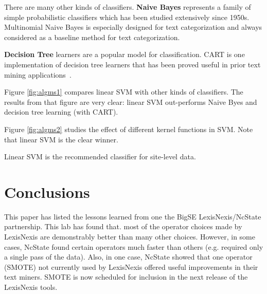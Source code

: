 \documentclass{sig-alternate-05-2015}
\theoremstyle{break}
\begin{document}
There are many other kinds of classifiers.
\textbf{Naive Bayes} represents a family of simple probabilistic classifiers which has been studied extensively since 1950s. Multinomial Naive Bayes is especially designed for text categorization \cite{mccallum1998comparison} and always considered as a baseline method for text categorization. 

\textbf{Decision Tree} learners are  a popular model for classification. CART is one implementation of decision tree learners that has been proved useful in prior text mining applications~\cite{miotto2005supporting}.

 
Figure \ref{fig:algms1} compares linear SVM with other kinds
of classifiers. The results from that figure are very clear:
linear SVM out-performs Naive Byes and decision tree learning
(with CART).
 
Figure \ref{fig:algms2} studies the effect of different
kernel functions in SVM. Note that linear SVM is the clear winner.
\begin{lesson}
Linear SVM is the recommended classifier for site-level data.
\end{lesson}
 











\section{Conclusions}
\label{sect:Conclusions}



This paper has listed the lessons learned from one the BigSE LexisNexis/NcState partnership.
This lab has found that.
most  of the operator choices made by LexisNexis are
  demonstrably better than many other choices.
However,  in some cases, NcState found certain operators
much faster than others (e.g. required only a single pass
of the data).
Also, in one case, NcState showed that one operator (SMOTE) not currently
used by LexisNexis offered useful improvements in their text miners.
SMOTE is now scheduled for inclusion in the next release
of the LexisNexis tools.
\end{document}
